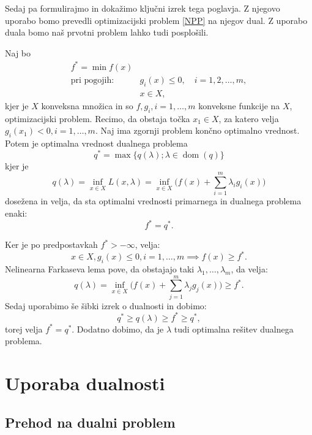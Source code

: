 \documentclass[mat1]{fmfdelo}
\DeclareMathOperator{\dom}{dom}
\begin{document}
Sedaj pa formulirajmo in dokažimo ključni izrek tega poglavja. Z njegovo uporabo bomo prevedli optimizacijski problem \eqref{NPP} na njegov dual. Z uporabo duala bomo naš prvotni problem lahko tudi posplošili.

\begin{izrek}\label{izrekdual}
	Naj bo
	\begin{align*}
	f^* =  \min f(x)\\ 
	\text{pri pogojih: } &g_i(x) \le 0, \quad i = 1,2,\ldots,m, \\
	&x\in X,
	\end{align*}
	kjer je $X$ konveksna množica in so $f, g_i, i = 1,\ldots,m$ konveksne funkcije na $X$, optimizacijski problem. Recimo, da obstaja točka $x_1 \in X$, za katero velja $g_i(x_1) < 0, i =1, \ldots, m$. Naj ima zgornji problem končno optimalno vrednost. Potem je optimalna vrednost dualnega problema
	$$  q^* = \max\{q(\lambda); \lambda \in \dom(q)\} $$
	kjer je 
	$$ q(\lambda) = \inf_{x\in X} L(x, \lambda) = \inf_{x \in X}\Big( f(x) + \sum_{i=1}^{m}\lambda_ig_i(x)	\Big)$$
	dosežena in velja, da sta optimalni vrednosti primarnega in dualnega problema enaki: 
	$$ f^* = q^*.$$	
\end{izrek}

\begin{dokaz}
	Ker je po predpostavkah  $f^* > -\infty$, velja: 
	$$ x\in X, g_i(x) \le 0, i = 1, \ldots, m \implies f(x) \ge f^*.$$
	Nelinearna Farkaseva lema pove, da obstajajo taki $\lambda_1, \ldots,  \lambda_m$, da velja: 
	$$ q(\lambda) = \inf_{x \in X} \Big(f(x) + \sum_{j=1}^{m}\lambda_jg_j(x)\Big)  \ge f^*.$$ 
	Sedaj uporabimo še šibki izrek o dualnosti in dobimo: 
	$$ q^* \ge q(\lambda) \ge f^* \ge q^*,$$
	torej velja $f^* = q^*$. Dodatno dobimo, da je $\lambda$ tudi optimalna rešitev dualnega problema. 
\end{dokaz}

\section{Uporaba dualnosti}
\label{updual}

\subsection{Prehod na dualni problem}
\end{document}
